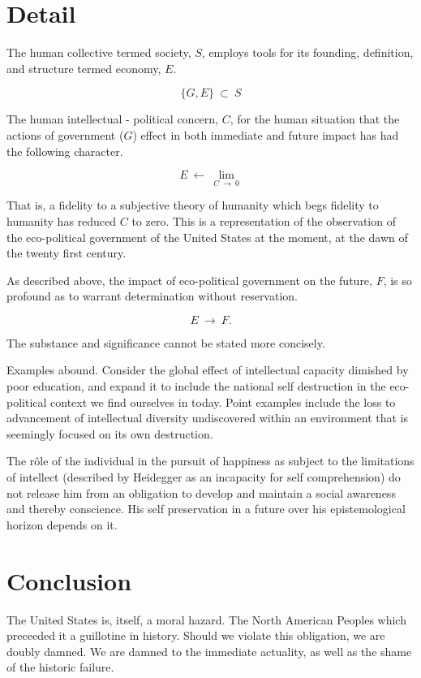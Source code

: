 \documentclass{article}
\begin{document}
\section{Detail}


The human collective termed society, $S$, employs tools for its
founding, definition, and structure termed economy, $E$.

\[
 \{ G, E \}\ \subset\ S
\]

The human intellectual - political concern, $C$, for the human
situation that the actions of government ($G$) effect in both
immediate and future impact has had the following character.

\[
 E\ \leftarrow\ \lim_{C\ \rightarrow\ 0}
\]

That is, a fidelity to a subjective theory of humanity which begs
fidelity to humanity has reduced $C$ to zero.  This is a
representation of the observation of the eco-political government of
the United States at the moment, at the dawn of the twenty first
century.

As described above, the impact of eco-political government on the
future, $F$, is so profound as to warrant determination without
reservation.

\[
 E\ \rightarrow\ F.
\]

The substance and significance cannot be stated more concisely.

Examples abound.  Consider the global effect of intellectual capacity
dimished by poor education, and expand it to include the national self
destruction in the eco-political context we find ourselves in today.
Point examples include the loss to advancement of intellectual
diversity undiscovered within an environment that is seemingly focused
on its own destruction.  

The r\^ole of the individual in the pursuit of happiness as subject to
the limitations of intellect (described by Heidegger as an incapacity
for self comprehension) do not release him from an obligation to develop
and maintain a social awareness and thereby conscience.  His self
preservation in a future over his epistemological horizon depends on
it.

\section{Conclusion}

The United States is, itself, a moral hazard.  The North American
Peoples which preceeded it a guillotine in history.  Should we violate
this obligation, we are doubly damned.  We are damned to the immediate
actuality, as well as the shame of the historic failure.
\end{document}
